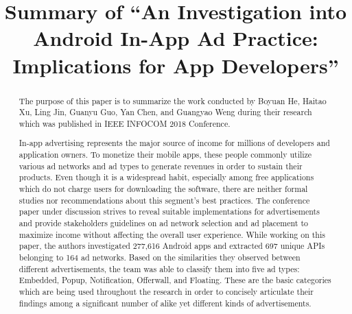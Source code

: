 \documentclass[conference]{IEEEtran}
\begin{document}
\title{Summary of “An Investigation into Android In-App Ad Practice: Implications for App Developers”  \\
}

\author{
\and
{}
}

\maketitle

\begin{abstract}
The purpose of this paper is to summarize the work\cite{ReferencePaper} conducted by Boyuan He, Haitao Xu, Ling Jin, Guanyu Guo, Yan Chen, and Guangyao Weng during their research which was published in IEEE INFOCOM 2018 Conference.

In-app advertising represents the major source of income for millions of developers and application owners. To monetize their mobile apps, these people commonly utilize various ad networks and ad types to generate revenues in order to sustain their products. Even though it is a widespread habit, especially among free applications which do not charge users for downloading the software, there are neither formal studies nor recommendations about this segment’s best practices. The conference paper under discussion strives to reveal suitable implementations for advertisements and provide stakeholders guidelines on ad network selection and ad placement to maximize income without affecting the overall user experience. While working on this paper, the authors investigated 277,616 Android apps and extracted 697 unique APIs belonging to 164 ad networks. Based on the similarities they observed between different advertisements, the team was able to classify them into five ad types: Embedded, Popup, Notification, Offerwall, and Floating. These are the basic categories which are being used throughout the research in order to concisely articulate their findings among a significant number of alike yet different kinds of advertisements.
\end{abstract}
\end{document}
